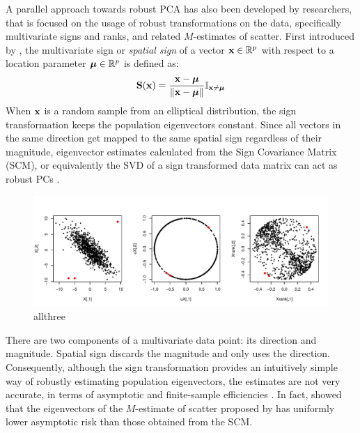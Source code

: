 A parallel approach towards robust PCA has also been developed by researchers, that is focused on the usage of robust transformations on the data, specifically multivariate signs and ranks, and related $M$-estimates of scatter. First introduced by \cite{MottonenOja95}, the multivariate sign or \textit{spatial sign} of a vector ${\bf{x}} \in {\mathbb{R}}^p$ with respect to a location parameter ${\boldsymbol{\mu}} \in {\mathbb{R}}^p$ is defined as:
%
$$
{\mathbf{S}} ({\bf{x}}) = \frac{{\bf{x}}  - {\boldsymbol{\mu}} }{\| {\bf{x}} - {\boldsymbol{\mu}}\|} {\mathbb{I}}_{{\bf{x}} \neq {\boldsymbol{\mu}}}
$$
%
When ${\bf{x}}$ is a random sample from an elliptical distribution, the sign transformation keeps the population eigenvectors constant. Since all vectors in the same direction get mapped to the same spatial sign regardless of their magnitude, eigenvector estimates calculated from the Sign Covariance Matrix (SCM), or equivalently the SVD of a sign transformed data matrix can act as robust PCs \citep{LocantoreEtal99,visuri00}.

\begin{figure}[t]
\centering
\includegraphics[width=\textwidth]{allthree}
\caption{allthree}
\label{fig1:allthree}
\end{figure}

There are two components of a multivariate data point: its direction and magnitude. Spatial sign discards the magnitude and only uses the direction. Consequently, although the sign transformation provides an intuitively simple way of robustly estimating population eigenvectors, the estimates are not very accurate, in terms of asymptotic and finite-sample efficiencies \citep{Majumdar15}. In fact, \cite{magyar14} showed that the eigenvectors of the $M$-estimate of scatter proposed by \cite{tyler87} has uniformly lower asymptotic risk than those obtained from the SCM.

